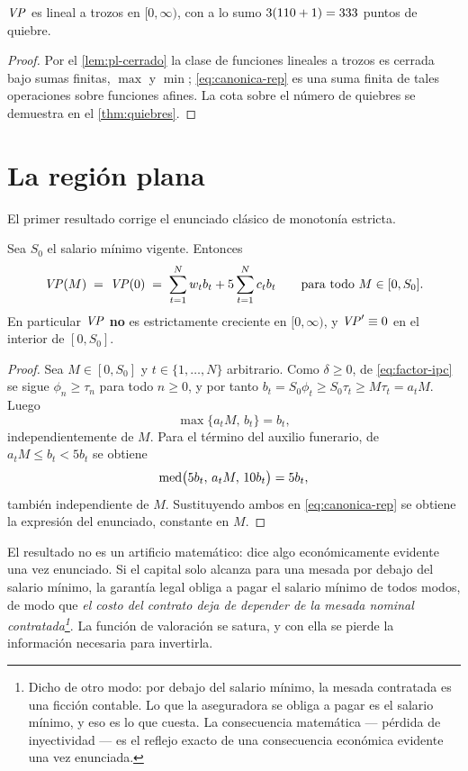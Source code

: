 \begin{proposition}
\label{prop:pl}
$\mathit{VP}$ es lineal a trozos en $[0,\infty)$, con a lo sumo
$3(110+1)=333$ puntos de quiebre.
\end{proposition}
\begin{proof}
Por el \cref{lem:pl-cerrado} la clase de funciones lineales a trozos es cerrada
bajo sumas finitas, $\max$ y $\min$; \cref{eq:canonica-rep} es una suma finita de
tales operaciones sobre funciones afines. La cota sobre el número de quiebres se
demuestra en el \cref{thm:quiebres}.
\end{proof}

\section{La región plana}

El primer resultado corrige el enunciado clásico de monotonía estricta.

\begin{theorem}
\label{thm:region-plana}
Sea $S_0$ el salario mínimo vigente. Entonces
\[
  \mathit{VP}(M)\;=\;\mathit{VP}(0)\;=\;\sum_{t=1}^N w_tb_t+5\sum_{t=1}^N c_tb_t
  \qquad\text{para todo } M\in[0,S_0].
\]
En particular $\mathit{VP}$ \textbf{no} es estrictamente creciente en $[0,\infty)$, y
$\mathit{VP}'\equiv0$ en el interior de $[0,S_0]$.
\end{theorem}
\begin{proof}
Sea $M\in[0,S_0]$ y $t\in\{1,\dots,N\}$ arbitrario. Como $\delta\ge0$, de
\cref{eq:factor-ipc} se sigue $\phi_{n}\ge\tau_{n}$ para todo $n\ge0$, y por tanto
$b_t=S_0\phi_t\ge S_0\tau_t\ge M\tau_t=a_tM$. Luego
\[
  \max\{a_tM,\,b_t\}=b_t ,
\]
independientemente de $M$. Para el término del auxilio funerario, de
$a_tM\le b_t<5b_t$ se obtiene
\[
  \operatorname{med}\bigl(5b_t,\,a_tM,\,10b_t\bigr)=5b_t ,
\]
también independiente de $M$. Sustituyendo ambos en \cref{eq:canonica-rep} se
obtiene la expresión del enunciado, constante en $M$.
\end{proof}

\begin{remark}
El resultado no es un artificio matemático: dice algo económicamente evidente una
vez enunciado. Si el capital solo alcanza para una mesada por debajo del salario
mínimo, la garantía legal obliga a pagar el salario mínimo de todos modos, de modo
que \emph{el costo del contrato deja de depender de la mesada nominal
contratada\footnote{Dicho de otro modo: por debajo del salario mínimo, la mesada contratada es una ficción contable. Lo que la aseguradora se obliga a pagar es el salario mínimo, y eso es lo que cuesta. La consecuencia matemática --- pérdida de inyectividad --- es el reflejo exacto de una consecuencia económica evidente una vez enunciada.}}. La función de valoración se satura, y con ella se pierde la
información necesaria para invertirla.
\end{remark}

